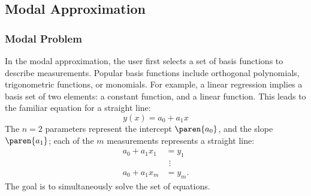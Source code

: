 \subsection{\label{ssec:modal approx}Modal Approximation}  %
\subsubsection{\label{ssec:modal problem}Modal Problem}  %
In the modal approximation, the user first selects a set of basis functions to describe measurements. Popular basis functions include orthogonal polynomials, trigonometric functions, or monomials. For example, a linear regression implies a basis set of two elements: a constant function, and a linear function. This leads to the familiar equation for a straight line:
  \begin{equation*}   %
    y(x) = a_{0} + a_{1} x
  \end{equation*}
The $n=2$ parameters represent the intercept $\paren{a_{0}}$, and the slope $\paren{a_{1}}$; each of the $m$ measurements represents a straight line:
  \begin{equation*}   %
   \begin{split}
     a_{0} + a_{1} x_{1} &= y_{1} \\
       & \ \, \vdots \\
     a_{0} + a_{1} x_{m} &= y_{m} .
   \end{split}
  \end{equation*}
The goal is to simultaneously solve the set of equations.

